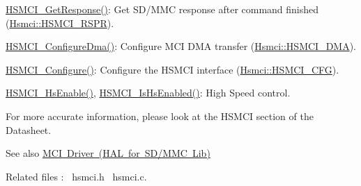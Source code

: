 \begin{DoxyEnumerate}
\item \mbox{\hyperlink{group__hsmci__functions_gafb6f3467813115f494f67c125f821264}{H\+S\+M\+C\+I\+\_\+\+Get\+Response()}}\+: Get S\+D/\+M\+MC response after command finished (\mbox{\hyperlink{structHsmci_a94878c9186626d34e9852fa3db8ed9e1}{Hsmci\+::\+H\+S\+M\+C\+I\+\_\+\+R\+S\+PR}}).
\item \mbox{\hyperlink{group__hsmci__functions_gaceb167f796372edad0ce22b545dfbf54}{H\+S\+M\+C\+I\+\_\+\+Configure\+Dma()}}\+: Configure M\+CI D\+MA transfer (\mbox{\hyperlink{structHsmci_a20a021186a3b31688811ac35b3da6e84}{Hsmci\+::\+H\+S\+M\+C\+I\+\_\+\+D\+MA}}).
\item \mbox{\hyperlink{group__hsmci__functions_gae212bc49645bc7b10e0f46159737f874}{H\+S\+M\+C\+I\+\_\+\+Configure()}}\+: Configure the H\+S\+M\+CI interface (\mbox{\hyperlink{structHsmci_a91f1df1b82f3ffc1c86f3a0ab9a90333}{Hsmci\+::\+H\+S\+M\+C\+I\+\_\+\+C\+FG}}).
\item \mbox{\hyperlink{group__hsmci__functions_ga9365f2817b47644f8c0f325a915fb141}{H\+S\+M\+C\+I\+\_\+\+Hs\+Enable()}}, \mbox{\hyperlink{group__hsmci__functions_gad4ba27f7339c9558b66aef5d9ebf6cab}{H\+S\+M\+C\+I\+\_\+\+Is\+Hs\+Enabled()}}\+: High Speed control.
\end{DoxyEnumerate}

For more accurate information, please look at the H\+S\+M\+CI section of the Datasheet.

\begin{DoxySeeAlso}{See also}
\mbox{\hyperlink{group__mcid__module}{M\+CI Driver (H\+AL for S\+D/\+M\+MC Lib)}}
\end{DoxySeeAlso}
Related files \+:~\newline
hsmci.\+h~\newline
 hsmci.\+c.~\newline
 
